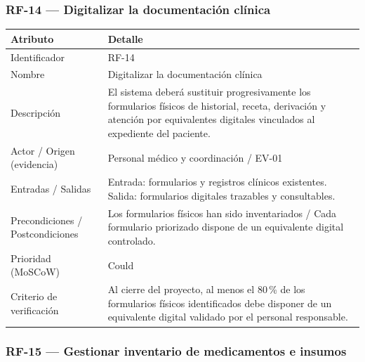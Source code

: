 \documentclass[11pt,a4paper]{article}
\begin{document}
	\subsubsection{RF-14 --- Digitalizar la documentación clínica}
	\begin{longtable}{p{} p{}}
		\toprule
		\textbf{Atributo} & \textbf{Detalle} \\
		\midrule
		\endhead
		Identificador & RF-14 \\
		Nombre & Digitalizar la documentación clínica \\
		Descripción & El sistema deberá sustituir progresivamente los formularios físicos de historial, receta, derivación y atención por equivalentes digitales vinculados al expediente del paciente. \\
		Actor / Origen (evidencia) & Personal médico y coordinación / EV-01 \\
		Entradas / Salidas & Entrada: formularios y registros clínicos existentes. Salida: formularios digitales trazables y consultables. \\
		Precondiciones / Postcondiciones & Los formularios físicos han sido inventariados / Cada formulario priorizado dispone de un equivalente digital controlado. \\
		Prioridad (MoSCoW) & Could \\
		Criterio de verificación & Al cierre del proyecto, al menos el 80\,\% de los formularios físicos identificados debe disponer de un equivalente digital validado por el personal responsable. \\
		\bottomrule
	\end{longtable}
	
	\subsubsection{RF-15 --- Gestionar inventario de medicamentos e insumos}
	
\end{document}
